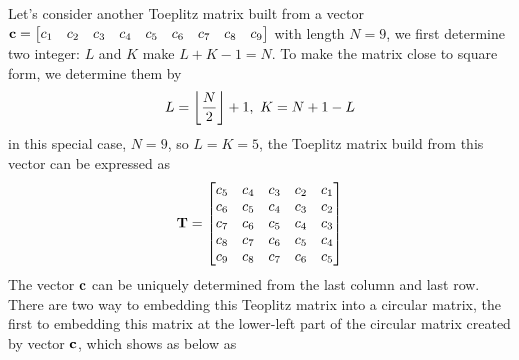 \documentclass[revised,endfloat]{geophysics}
\DeclarePairedDelimiter\floor{\lfloor}{\rfloor}
\begin{document}
Let's consider another Toeplitz matrix built from a vector ${\bf c} = \begin{bmatrix}
c_1 & c_2 & c_3 & c_4 & c_5 & c_6 & c_7 & c_8 & c_9 \end{bmatrix}$ with length $N=9$, we first determine two integer: $L$ and $K$ make $L+K-1= N $. To make the matrix close to square form, we determine them by
\begin{equation}
L = \floor*{\frac{N}{2}}+1 ,\,\, K = N+1-L
\label{eq11}
\end{equation}
in this special case, $N=9$, so $L=K=5$, the Toeplitz matrix build from this vector can be expressed as
\begin{equation}
{\bf T} = 
\begin{bmatrix}
c_5 & c_4 & c_3 & c_2 & c_1 \\ 
c_6 & c_5 & c_4 & c_3 & c_2 \\ 
c_7 & c_6 & c_5 & c_4 & c_3 \\ 
c_8 & c_7 & c_6 & c_5 & c_4 \\ 
c_9 & c_8 & c_7 & c_6 & c_5 \\ 
\end{bmatrix}
\label{eq12}
\end{equation} 
The vector ${\bf c}$ can be uniquely determined from the last column and last row. There are two way to embedding this Teoplitz matrix into a circular matrix, the first to embedding this matrix at the lower-left part of the circular matrix created by vector ${\bf c}$, which shows as below as
\begin{center}
\end{center}
\end{document}
